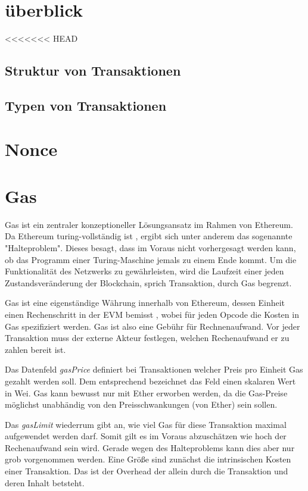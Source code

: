 \documentclass{llncs}
\begin{document}
\section{überblick}
<<<<<<< HEAD

\subsection{Struktur von Transaktionen}

\subsection{Typen von Transaktionen}

\section{Nonce}

\section{Gas}

Gas ist ein zentraler konzeptioneller Lösungsansatz im Rahmen von Ethereum. Da Ethereum turing-vollständig ist \cite[S. 1]{wood_ethereum/yellowpaper_2019}, ergibt sich unter anderem das sogenannte "Halteproblem". Dieses besagt, dass im Voraus nicht vorhergesagt werden kann, ob das Programm einer Turing-Maschine jemals zu einem Ende kommt. \cite[S.70]{davis_computability_2013} Um die Funktionalität des Netzwerks zu gewährleisten, wird die Laufzeit einer jeden Zustandsveränderung der Blockchain, sprich Transaktion, durch Gas begrenzt.

Gas ist eine eigenständige Währung innerhalb von Ethereum, dessen Einheit einen Rechenschritt in der EVM bemisst \cite[S. 9:3]{m.spain_oasics-tokeneconomics_2019}, wobei für jeden Opcode die Kosten in Gas spezifiziert werden. \cite[S. 25 ff.]{wood_ethereum/yellowpaper_2019} Gas ist also eine Gebühr für Rechnenaufwand. Vor jeder Transaktion muss der externe Akteur festlegen, welchen Rechenaufwand er zu zahlen bereit ist.

Das Datenfeld \textit{gasPrice} definiert bei Transaktionen welcher Preis pro Einheit Gas gezahlt werden soll. Dem entsprechend bezeichnet das Feld einen skalaren Wert in Wei. Gas kann bewusst nur mit Ether erworben werden, da die Gas-Preise möglichst unabhändig von den Preisschwankungen (von Ether) sein sollen. \cite[S. 7]{wood_ethereum/yellowpaper_2019}

Das \textit{gasLimit} wiederrum gibt an, wie viel Gas für diese Transaktion maximal aufgewendet werden darf. Somit gilt es im Voraus abzuschätzen wie hoch der Rechenaufwand sein wird. Gerade wegen des Halteproblems kann dies aber nur grob vorgenommen werden. Eine Größe sind zunächst die intrinsischen Kosten einer Transaktion. Das ist der Overhead der allein durch die Transaktion und deren Inhalt betsteht. 
\end{document}
